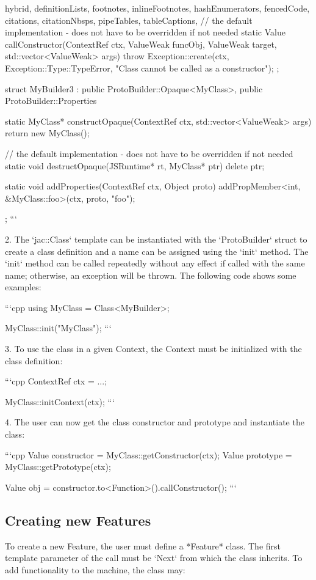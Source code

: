 \documentclass[
  digital,
  oneside,
  nosansbold,
  nocolorbold,
  lof,
  lot
]{fithesis4}
\begin{document}
\begin{markdown*}{%
  hybrid,
  definitionLists,
  footnotes,
  inlineFootnotes,
  hashEnumerators,
  fencedCode,
  citations,
  citationNbsps,
  pipeTables,
  tableCaptions,
}
{    // the default implementation - does not have to be overridden if not needed
    static Value callConstructor(ContextRef ctx, ValueWeak funcObj, ValueWeak target, std::vector<ValueWeak> args) {
        throw Exception::create(ctx, Exception::Type::TypeError, "Class cannot be called as a constructor");
    }
};

struct MyBuilder3 : public ProtoBuilder::Opaque<MyClass>, public ProtoBuilder::Properties {
    static MyClass* constructOpaque(ContextRef ctx, std::vector<ValueWeak> args) {
        return new MyClass();
    }

    // the default implementation - does not have to be overridden if not needed
    static void destructOpaque(JSRuntime* rt, MyClass* ptr) {
        delete ptr;
    }

    static void addProperties(ContextRef ctx, Object proto) {
        addPropMember<int, &MyClass::foo>(ctx, proto, "foo");
    }
};
```

  2. The `jac::Class` template can be instantiated with the `ProtoBuilder` struct to create a class definition and a name can be assigned using the `init` method. The `init` method can be called repeatedly without any effect if called with the same name; otherwise, an exception will be thrown. The following code shows some examples:

```cpp
using MyClass = Class<MyBuilder>;

MyClass::init("MyClass");
```

  3. To use the class in a given Context, the Context must be initialized with the class definition:

```cpp
ContextRef ctx = ...;

MyClass::initContext(ctx);
```

  4. The user can now get the class constructor and prototype and instantiate the class:

```cpp
Value constructor = MyClass::getConstructor(ctx);
Value prototype = MyClass::getPrototype(ctx);

Value obj = constructor.to<Function>().callConstructor();
```

\subsection{Creating new Features}

To create a new Feature, the user must define a *Feature* class. The first template parameter of the call must be `Next` from which the class inherits. To add functionality to the machine, the class may:


\end{markdown*}
\end{document}
